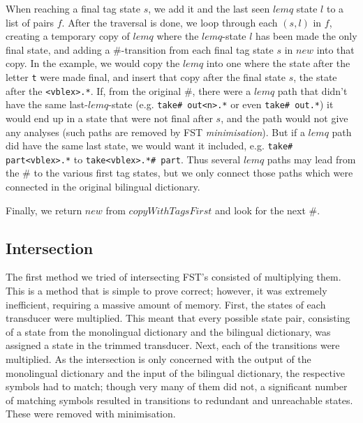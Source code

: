 \documentclass[10pt, a4paper]{article}
\newcommand{\ana}[1]{\texttt{#1}}
\begin{document}
When reaching a final tag state $s$, we add it and the last seen
$lemq$ state $l$ to a list of pairs $f$. After the traversal is done,
we loop through each $(s,l)$ in $f$, creating a temporary copy of
$lemq$ where the $lemq$-state $l$ has been made the only final state,
and adding a \#-transition from each final tag state $s$ in $new$ into
that copy. In the example, we would copy the $lemq$ into one where the
state after the letter \ana{t} were made final, and insert that copy
after the final state $s$, the state after the \ana{<vblex>.*}. If,
from the original \#, there were a $lemq$ path that didn't have the
same last-$lemq$-state (e.g. \ana{take\# out<n>.*} or even \ana{take\#
out.*}) it would end up in a state that were not final after $s$, and
the path would not give any analyses (such paths are removed by FST
\emph{minimisation}). But if a $lemq$ path did have the same last
state, we would want it included, e.g. \ana{take\# part<vblex>.*} to
\ana{take<vblex>.*\# part}. Thus several $lemq$ paths may lead from
the \# to the various first tag states, but we only connect those
paths which were connected in the original bilingual dictionary.

Finally, we return $new$ from $copyWithTagsFirst$ and look for the
next \#.

\subsection{Intersection}


The first method we tried of intersecting FST's consisted of
multiplying them.  This is a method that is simple to prove correct;
however, it was extremely inefficient, requiring a massive amount of
memory.  First, the states of each transducer were multiplied.  This
meant that every possible state pair, consisting of a state from the
monolingual dictionary and the bilingual dictionary, was assigned a
state in the trimmed transducer.  Next, each of the transitions were
multiplied.  As the intersection is only concerned with the output of
the monolingual dictionary and the input of the bilingual dictionary,
the respective symbols had to match; though very many of them did not,
a significant number of matching symbols resulted in transitions to
redundant and unreachable states.  These were removed with
minimisation.
\end{document}
